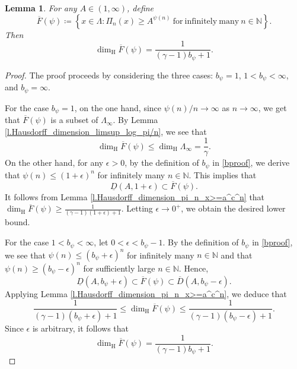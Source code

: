 \documentclass[12pt,reqno]{amsart}
\renewcommand{\=}{\coloneqq}
\theoremstyle{plain}
\newtheorem{lemma}[theorem]{Lemma}
\begin{document}
\begin{lemma}\label{l.Hausdorff_dimension_over_F_psi}
For any $A\in(1,\infty)$, define
     \begin{equation*}\label{e.def_over_F_psi}
        \overline{F}(\psi)\coloneqq
       \left\{
        x\in \Lambda:
        \Pi_{n}(x)\geq A^{\psi(n)}\
        \mathrm{for\ infinitely\ many}\ n\in \mathbb N
        \right\}.
     \end{equation*}
     Then
     \begin{equation*}
        \dim_{\mathrm{H}}\overline{F}(\psi)
        =\frac{1}{(\gamma-1)b_\psi+1}.
     \end{equation*}
\end{lemma}

\begin{proof}
The proof proceeds by considering the three cases: $b_\psi=1$, $1<b_\psi<\infty$, and $b_\psi=\infty$.

For the case $b_\psi=1$, on the one hand, since $\psi(n)/n\to \infty$ as $n\to \infty$, we get that $\overline{F}(\psi)$ is a subset of $\Lambda_{\infty}.$
   By Lemma \ref{l.Hausdorff_dimension_limsup_log_pi/n}, we see that
    \begin{equation*}
         \dim_{\mathrm{H}}\overline{F}(\psi)
         \leq  \dim_{\mathrm{H}} \Lambda_{\infty}
         =\frac{1}{\gamma}.
    \end{equation*}
On the other hand, for any $\epsilon>0$, by the definition of $b_\psi$ in \eqref{bproof}, we derive that $\psi(n)\leq (1+\epsilon)^n$
    for infinitely many $n\in \mathbb N$. This implies that
 \begin{equation*}
        \underline{D}(A,1+\epsilon)\subset \overline{F}(\psi).
    \end{equation*}
 It follows from Lemma \ref{l.Hausdorff_dimension_pi_n_x>=a^c^n}
    that $\dim_{\mathrm{H}}\overline{F}(\psi)\geq \frac{1}{(\gamma-1)(1+\epsilon)+1}$.
    Letting $\epsilon \to 0^{+}$, we obtain the desired lower bound.


 For the case $1<b_\psi<\infty$, let $0<\epsilon<b_\psi-1$. By the definition of $b_\psi$ in \eqref{bproof}, we see that $\psi(n)\leq (b_\psi+\epsilon)^{n}$ for infinitely many $n\in \mathbb N$ and that $\psi(n)\geq (b_\psi-\epsilon)^{n}$ for sufficiently large $n\in \mathbb N$. Hence,
\begin{equation*}
        \underline{D}(A,b_\psi+\epsilon)
        \subset
        \overline{F}(\psi)
        \subset
        \overline{D}(A,b_\psi-\epsilon).
    \end{equation*}
Applying Lemma \ref{l.Hausdorff_dimension_pi_n_x>=a^c^n}, we deduce that
    \begin{equation*}
        \frac{1}{(\gamma-1)(b_\psi+\epsilon)+1}\leq
        \dim_{\mathrm{H}}\overline{F}(\psi)
        \leq
        \frac{1}{(\gamma-1)(b_\psi-\epsilon)+1}.
    \end{equation*}
    Since $\epsilon$ is arbitrary, it follows that
    $$\dim_{\mathrm{H}}\overline{F}(\psi)=\frac{1}{(\gamma-1)b_\psi+1}.$$




\end{proof}
\end{document}
